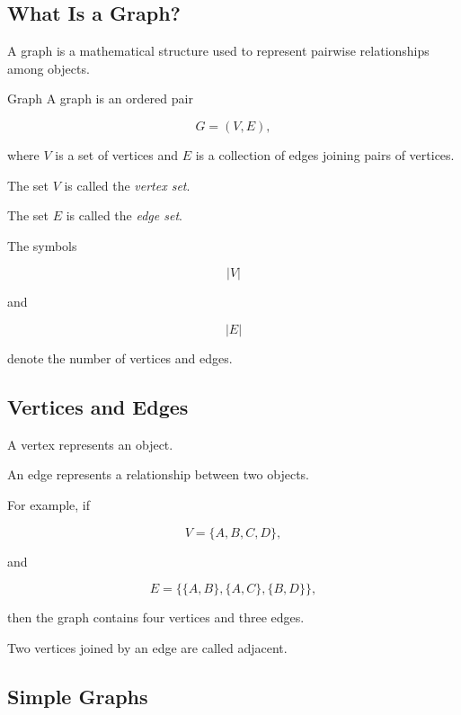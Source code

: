 \subsection{What Is a Graph?}
\label{subsec:what-is-a-graph}

A graph is a mathematical structure used to represent pairwise
relationships among objects.

\begin{definitionbox}{Graph}
A graph is an ordered pair

\[
\boxed{
G=(V,E),
}
\]

where \(V\) is a set of vertices and \(E\) is a collection of edges
joining pairs of vertices.
\end{definitionbox}

The set \(V\) is called the \emph{vertex set}.

The set \(E\) is called the \emph{edge set}.

The symbols

\[
|V|
\]

and

\[
|E|
\]

denote the number of vertices and edges.

\subsection{Vertices and Edges}
\label{subsec:vertices-and-edges}

A vertex represents an object.

An edge represents a relationship between two objects.

For example, if

\[
V=\{A,B,C,D\},
\]

and

\[
E=
\{
\{A,B\},
\{A,C\},
\{B,D\}
\},
\]

then the graph contains four vertices and three edges.

Two vertices joined by an edge are called adjacent.

\subsection{Simple Graphs}
\label{subsec:simple-graphs}

